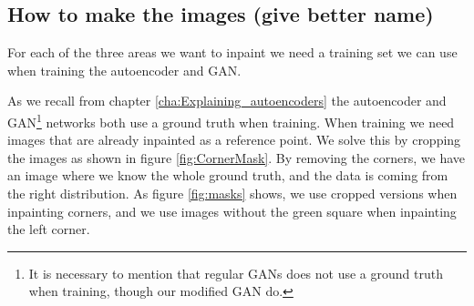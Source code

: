 \subsection{How to make the images (give better name)}
For each of the three areas we want to inpaint we need a training set we can use when training the autoencoder and GAN.

As we recall from chapter \ref{cha:Explaining_autoencoders} the autoencoder and GAN\footnote{It is necessary to mention that regular GANs does not use a ground truth when training, though our modified GAN do.} networks both use a ground truth when training.
When training we need images that are already inpainted as a reference point. We solve this by cropping the images as shown in figure \ref{fig:CornerMask}.
By removing the corners, we have an image where we know the whole ground truth, and the data is coming from the right distribution.
As figure \ref{fig:masks} shows, we use cropped versions when inpainting corners, and we use images without the green square when inpainting the left corner.

